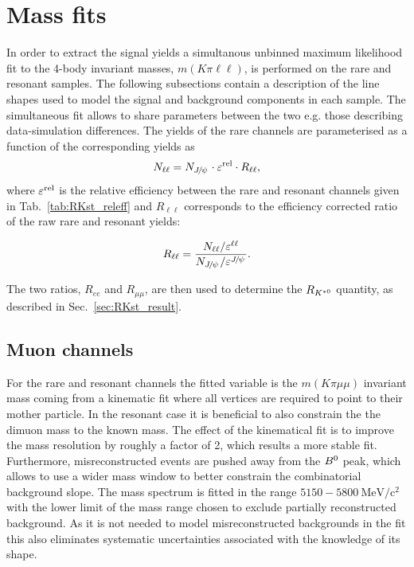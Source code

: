 \chapter{Mass fits}
\label{sec:rkst_fits}

In order to extract the signal yields a simultanous unbinned maximum likelihood fit
to the 4-body invariant masses, $m(K\pi\ell\ell)$, is performed on the rare and resonant samples.
The following subsections contain a description of the line shapes used to model
the signal and background components in each sample.
The simultaneous fit allows to share parameters between the two e.g. those describing data-simulation differences.
The yields of the rare channels are parameterised as a function of the corresponding \jpsi yields as
%
\begin{equation}
N_{\ell\ell} = N_{\jpsi} \cdot \varepsilon^{\rm rel} \cdot R_{\ell\ell},
\end{equation}
%
where $\varepsilon^{\rm rel}$ is the relative efficiency between the rare and resonant channels
given in Tab.~\ref{tab:RKst_releff} and
$R_{\ell\ell}$ corresponds to the efficiency corrected ratio of the raw rare and resonant yields:

\begin{equation}
R_{\ell\ell} = \frac{N_{\ell\ell} / \varepsilon^{\ell\ell}}{N_{\jpsi} / \varepsilon^{\jpsi}}.
\end{equation}

The two ratios, $R_{ee}$ and $R_{\mu\mu}$, are then used to determine
the $R_{{{K}^{*0}}}$ quantity, as described in Sec.~\ref{sec:RKst_result}.


\section{Muon channels}

For the rare and resonant \mumu channels the fitted variable is the $m(K\pi \mu\mu)$ invariant mass coming
from a kinematic fit where all vertices are required to point to their mother particle.
In the resonant case it is beneficial to also constrain the the dimuon mass to the known \jpsi mass.
The effect of the kinematical fit is to improve the mass resolution by roughly a factor of 2, which results
a more stable fit. Furthermore, misreconstructed events are pushed away from the ${{B}^0}$ peak, which allows to
use a wider mass window to better constrain the combinatorial background slope.
The mass spectrum is fitted in the range $5150 - 5800 ~\mbox{MeV/c}{^2}$ with the lower limit
of the mass range chosen to exclude partially reconstructed background.
As it is not needed to model misreconstructed backgrounds in the fit this also
eliminates systematic uncertainties associated with the knowledge of its shape. 

